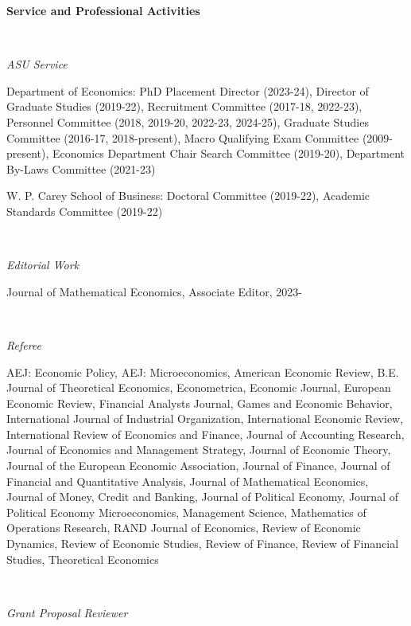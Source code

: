 \documentclass[11pt]{article}
\begin{document}
 
 
\textbf{Service and Professional Activities}

\ \




\emph{ASU Service}

\vspace{0.3cm}

Department of Economics: PhD Placement Director (2023-24), Director of Graduate Studies (2019-22), Recruitment Committee (2017-18, 2022-23), Personnel Committee (2018, 2019-20, 2022-23, 2024-25), Graduate Studies Committee (2016-17, 2018-present), Macro Qualifying Exam Committee (2009-present), Economics Department Chair Search Committee (2019-20), Department By-Laws Committee (2021-23)
\medskip

W. P. Carey School of Business:
Doctoral Committee (2019-22), Academic Standards Committee (2019-22) 



\ \
 

\emph{Editorial Work}

\vspace{0.3cm}

Journal of Mathematical Economics, Associate Editor, 2023-

\ \

\emph{Referee}


\vspace{0.3cm}

AEJ: Economic Policy,  AEJ: Microeconomics, American Economic Review, B.E. Journal of Theoretical Economics, Econometrica, Economic Journal, European Economic Review, Financial Analysts Journal, Games and Economic Behavior, International Journal of Industrial Organization, International Economic Review, International Review of Economics and Finance, Journal of Accounting Research, Journal of Economics and Management Strategy, Journal of Economic Theory,  Journal of the European Economic Association, Journal of Finance, Journal of Financial and Quantitative Analysis, Journal of Mathematical Economics,
Journal of Money, Credit and Banking, Journal of Political Economy, Journal of Political Economy Microeconomics, Management Science, Mathematics of Operations Research,  RAND Journal of Economics, Review of Economic Dynamics, Review of Economic Studies, Review of Finance, Review of Financial Studies, Theoretical Economics

 \ \

\emph{Grant Proposal Reviewer}

\vspace{0.3cm}
\end{document}
